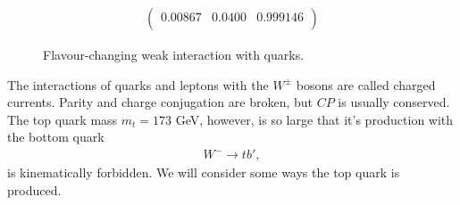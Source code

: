 \documentclass[11pt]{article}
\begin{document}
\begin{multicols}{2}
\begin{flushleft}
\begin{align*}
\begin{pmatrix}
0.00867 & 0.0400 & 0.999146\\
\end{pmatrix}
\end{align*}
\begin{figure}[H]
\centering
\label{fig:: flavour change}
\caption{Flavour-changing weak interaction with quarks.}
\end{figure}
The interactions of quarks and leptons with the $W^{\pm}$ bosons are called charged currents. Parity and charge conjugation are broken, but $CP$ is usually conserved. The top quark mass $m_t = 173$ GeV, however, is so large that it's production with the bottom quark
\begin{align*}
W^- \rightarrow t b',
\end{align*}
is kinematically forbidden. We will consider some ways the top quark is produced.
\end{flushleft}


\end{multicols}
\end{document}
